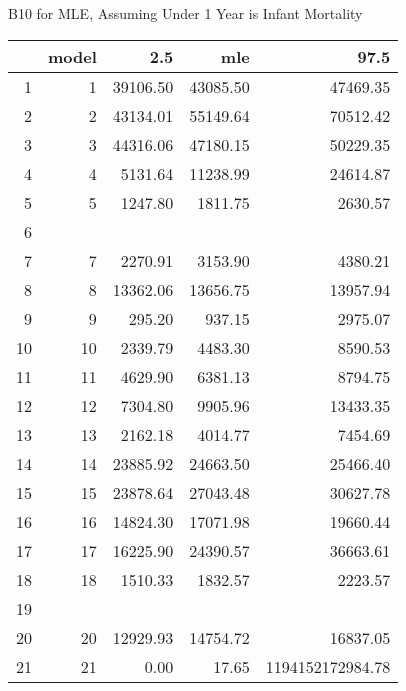 \documentclass{article}
\begin{document}

B10 for MLE, Assuming Under 1 Year is Infant Mortality
\begin{table}[ht]
\centering
\begin{tabular}{rrrrr}
  \hline
 & model & 2.5 & mle & 97.5 \\ 
  \hline
1 & 1 & 39106.50 & 43085.50 & 47469.35 \\ 
  2 & 2 & 43134.01 & 55149.64 & 70512.42 \\ 
  3 & 3 & 44316.06 & 47180.15 & 50229.35 \\ 
  4 & 4 & 5131.64 & 11238.99 & 24614.87 \\ 
  5 & 5 & 1247.80 & 1811.75 & 2630.57 \\ 
  6 &  &  &  &  \\ 
  7 & 7 & 2270.91 & 3153.90 & 4380.21 \\ 
  8 & 8 & 13362.06 & 13656.75 & 13957.94 \\ 
  9 & 9 & 295.20 & 937.15 & 2975.07 \\ 
  10 & 10 & 2339.79 & 4483.30 & 8590.53 \\ 
  11 & 11 & 4629.90 & 6381.13 & 8794.75 \\ 
  12 & 12 & 7304.80 & 9905.96 & 13433.35 \\ 
  13 & 13 & 2162.18 & 4014.77 & 7454.69 \\ 
  14 & 14 & 23885.92 & 24663.50 & 25466.40 \\ 
  15 & 15 & 23878.64 & 27043.48 & 30627.78 \\ 
  16 & 16 & 14824.30 & 17071.98 & 19660.44 \\ 
  17 & 17 & 16225.90 & 24390.57 & 36663.61 \\ 
  18 & 18 & 1510.33 & 1832.57 & 2223.57 \\ 
  19 &  &  &  &  \\ 
  20 & 20 & 12929.93 & 14754.72 & 16837.05 \\ 
  21 & 21 & 0.00 & 17.65 & 1194152172984.78 \\ 
   \hline
\end{tabular}
\end{table}
\end{document}
